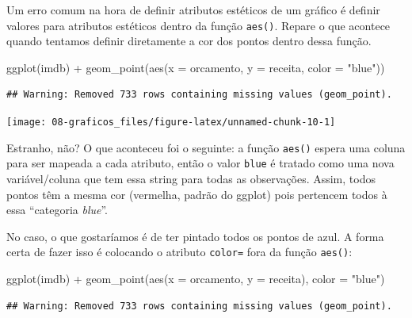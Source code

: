 \documentclass[
]{book}
\newenvironment{Shaded}{\begin{snugshade}}{\end{snugshade}}
\newcommand{\AttributeTok}[1]{\textcolor[rgb]{0.77,0.63,0.00}{#1}}
\newcommand{\FunctionTok}[1]{\textcolor[rgb]{0.00,0.00,0.00}{#1}}
\newcommand{\NormalTok}[1]{#1}
\newcommand{\SpecialCharTok}[1]{\textcolor[rgb]{0.00,0.00,0.00}{#1}}
\newcommand{\StringTok}[1]{\textcolor[rgb]{0.31,0.60,0.02}{#1}}
\begin{document}
Um erro comum na hora de definir atributos estéticos de um gráfico é definir valores para atributos estéticos dentro da função \texttt{aes()}. Repare o que acontece quando tentamos definir diretamente a cor dos pontos dentro dessa função.

\begin{Shaded}
\begin{Highlighting}[]
\FunctionTok{ggplot}\NormalTok{(imdb) }\SpecialCharTok{+}
  \FunctionTok{geom\_point}\NormalTok{(}\FunctionTok{aes}\NormalTok{(}\AttributeTok{x =}\NormalTok{ orcamento, }\AttributeTok{y =}\NormalTok{ receita, }\AttributeTok{color =} \StringTok{"blue"}\NormalTok{))}
\end{Highlighting}
\end{Shaded}

\begin{verbatim}
## Warning: Removed 733 rows containing missing values (geom_point).
\end{verbatim}

\begin{center}\texttt{[image: 08-graficos\_files/figure-latex/unnamed-chunk-10-1]} \end{center}

Estranho, não? O que aconteceu foi o seguinte: a função \texttt{aes()} espera uma coluna para ser mapeada a cada atributo, então o valor \texttt{blue} é tratado como uma nova variável/coluna que tem essa string para todas as observações. Assim, todos pontos têm a mesma cor (vermelha, padrão do ggplot) pois pertencem todos à essa ``categoria \emph{blue}''.

No caso, o que gostaríamos é de ter pintado todos os pontos de azul. A forma certa de fazer isso é colocando o atributo \texttt{color=} fora da função \texttt{aes()}:

\begin{Shaded}
\begin{Highlighting}[]
\FunctionTok{ggplot}\NormalTok{(imdb) }\SpecialCharTok{+}
  \FunctionTok{geom\_point}\NormalTok{(}\FunctionTok{aes}\NormalTok{(}\AttributeTok{x =}\NormalTok{ orcamento, }\AttributeTok{y =}\NormalTok{ receita), }\AttributeTok{color =} \StringTok{"blue"}\NormalTok{)}
\end{Highlighting}
\end{Shaded}

\begin{verbatim}
## Warning: Removed 733 rows containing missing values (geom_point).
\end{verbatim}
\end{document}

